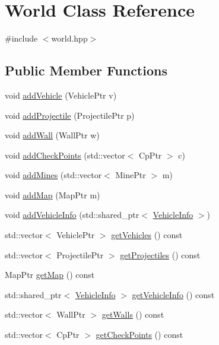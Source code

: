 \hypertarget{classWorld}{}\section{World Class Reference}
\label{classWorld}


{\ttfamily \#include $<$world.\+hpp$>$}

\subsection*{Public Member Functions}
\begin{DoxyCompactItemize}
\item 
void \hyperlink{classWorld_a5160225e83eae7837e624ef90d4db29f}{add\+Vehicle} (Vehicle\+Ptr v)
\item 
void \hyperlink{classWorld_a0dabad321c25115c1899d53b0525f1ff}{add\+Projectile} (Projectile\+Ptr p)
\item 
void \hyperlink{classWorld_aee0ecea7671c2b87896ae48e2b8b4db0}{add\+Wall} (Wall\+Ptr w)
\item 
void \hyperlink{classWorld_ae732dc0bbb384d5799c17b18f20ff52d}{add\+Check\+Points} (std\+::vector$<$ Cp\+Ptr $>$ c)
\item 
void \hyperlink{classWorld_a6cfa1ac0ab2d191cddb6273119b2e8b6}{add\+Mines} (std\+::vector$<$ Mine\+Ptr $>$ m)
\item 
void \hyperlink{classWorld_afbde7c41f335e5abdf67935e4ef39d12}{add\+Map} (Map\+Ptr m)
\item 
void \hyperlink{classWorld_a0fa5babafd1bb5749f7f3d664cf996c5}{add\+Vehicle\+Info} (std\+::shared\+\_\+ptr$<$ \hyperlink{structVehicleInfo}{Vehicle\+Info} $>$)
\item 
std\+::vector$<$ Vehicle\+Ptr $>$ \hyperlink{classWorld_afa144f2f17a04087776721af7b225387}{get\+Vehicles} () const
\item 
std\+::vector$<$ Projectile\+Ptr $>$ \hyperlink{classWorld_a52e57fb3229773869172a71d49b29783}{get\+Projectiles} () const
\item 
Map\+Ptr \hyperlink{classWorld_a37b996591688a176897dc8157cdbb18d}{get\+Map} () const
\item 
std\+::shared\+\_\+ptr$<$ \hyperlink{structVehicleInfo}{Vehicle\+Info} $>$ \hyperlink{classWorld_a74d8300035e9495d954e5f6ef90b64b5}{get\+Vehicle\+Info} () const
\item 
std\+::vector$<$ Wall\+Ptr $>$ \hyperlink{classWorld_a2abd0169432b982782a77914bffd3fa0}{get\+Walls} () const
\item 
std\+::vector$<$ Cp\+Ptr $>$ \hyperlink{classWorld_a86ec41dd36a293bd86f6ed9070863c19}{get\+Check\+Points} () const

\end{DoxyCompactItemize}
